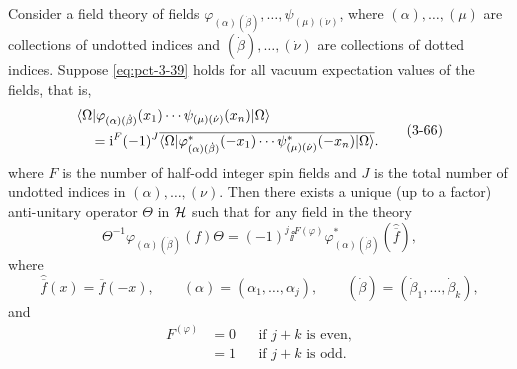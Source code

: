 \begin{theorem}[3-9]\label{thm:ch3-pct}
Consider a field theory of fields
$\varphi_{(\alpha)(\dot\beta)},\ldots,\psi_{(\mu)(\dot\nu)}$, where
$(\alpha),\ldots,(\mu)$ are collections of undotted indices and
$(\dot\beta),\ldots,(\dot\nu)$ are collections of dotted indices.  Suppose
\eqref{eq:pct-3-39} holds for all vacuum expectation values of the fields, that is,
\begin{equation}
\begin{aligned}
&\langle \Omega\rvert\varphi_{(\alpha)(\dot\beta)}(x_1)\cdots
\psi_{(\mu)(\dot\nu)}(x_n)\lvert \Omega\rangle \\
&\quad={ }\mathrm{i}^F(-1)^J
\overline{\langle \Omega\rvert\varphi^*_{(\alpha)(\dot\beta)}(-x_1)\cdots
\psi^*_{(\mu)(\dot\nu)}(-x_n)\lvert \Omega\rangle} .
\end{aligned}
\tag{3-66}\label{eq:ch3-pct-vacuum-identity}
\end{equation}
where $F$ is the number of half-odd integer spin fields and $J$ is the total
number of undotted indices in $(\alpha),\ldots,(\nu)$.  Then there exists a
unique (up to a factor) anti-unitary operator $\Theta$ in $\mathcal{H}$ such that
for any field in the theory
\begin{equation}
  \Theta^{-1}\varphi_{(\alpha)(\dot\beta)}(f)\Theta
  =(-1)^j\ii^{F(\varphi)}
  \varphi^*_{(\alpha)(\dot\beta)}(\widehat{\overline f}),
  \tag{3-67}\label{eq:ch3-pct-field-transformation}
\end{equation}
where
\begin{equation*}
  \widehat{\overline f}(x)=\overline f(-x),\qquad
  (\alpha)=(\alpha_1,\ldots,\alpha_j),\qquad
  (\dot\beta)=(\dot\beta_1,\ldots,\dot\beta_k),
\end{equation*}
and
\begin{equation*}
  \begin{aligned}
    F^{(\varphi)}&=0 &&\text{if $j+k$ is even},\\
    &=1 &&\text{if $j+k$ is odd}.
  \end{aligned}
\end{equation*}
\end{theorem}

